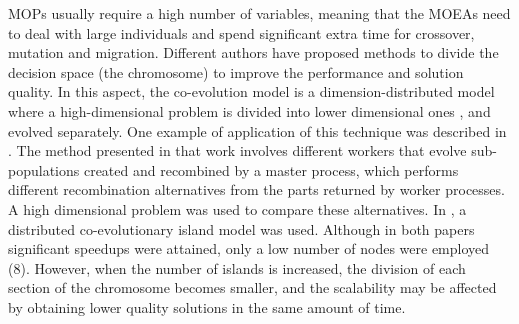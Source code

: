 \documentclass[preprint]{elsarticle}
\begin{document}
MOPs usually require a high number of variables, meaning that the MOEAs need to deal with large individuals and spend significant extra time for crossover, mutation and migration. Different authors have proposed methods to divide the decision space (the chromosome) to improve the performance and solution quality. In this aspect, the co-evolution model is a dimension-distributed model where a high-dimensional problem is divided into lower dimensional ones \citep{Gong15models,Tonda12cooperative}, and evolved separately. One example of application of this technique was described in \citep{Kimovski15Parallel}. The method presented in that work involves different workers that evolve sub-populations created and recombined by a master process, which performs different recombination alternatives from the parts returned by worker processes. A high dimensional problem was used to compare these
alternatives. In \citep{Dorronsoro13superlinear}, a distributed
co-evolutionary island model was used.  Although in both papers
significant speedups were attained, only a low number of nodes were
employed (8). However, when the number of islands is increased, the division
of each section of the chromosome becomes smaller, and the scalability
may be affected by obtaining lower quality solutions in the same
amount of time. 





\end{document}
